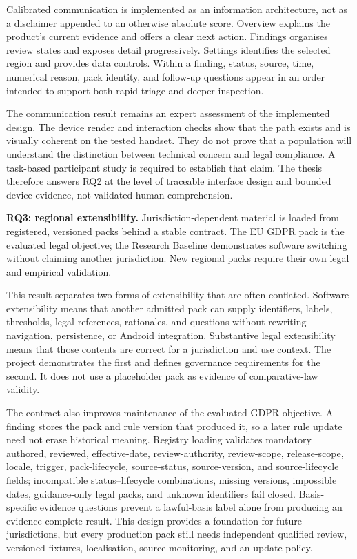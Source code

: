 Calibrated communication is implemented as an information architecture, not as a disclaimer appended to an otherwise absolute score. Overview explains the product's current evidence and offers a clear next action. Findings organises review states and exposes detail progressively. Settings identifies the selected region and provides data controls. Within a finding, status, source, time, numerical reason, pack identity, and follow-up questions appear in an order intended to support both rapid triage and deeper inspection.

The communication result remains an expert assessment of the implemented design. The device render and interaction checks show that the path exists and is visually coherent on the tested handset. They do not prove that a population will understand the distinction between technical concern and legal compliance. A task-based participant study is required to establish that claim. The thesis therefore answers RQ2 at the level of traceable interface design and bounded device evidence, not validated human comprehension.

\textbf{RQ3: regional extensibility.} Jurisdiction-dependent material is loaded from registered, versioned packs behind a stable contract. The EU GDPR pack is the evaluated legal objective; the Research Baseline demonstrates software switching without claiming another jurisdiction. New regional packs require their own legal and empirical validation.

This result separates two forms of extensibility that are often conflated. Software extensibility means that another admitted pack can supply identifiers, labels, thresholds, legal references, rationales, and questions without rewriting navigation, persistence, or Android integration. Substantive legal extensibility means that those contents are correct for a jurisdiction and use context. The project demonstrates the first and defines governance requirements for the second. It does not use a placeholder pack as evidence of comparative-law validity.

The contract also improves maintenance of the evaluated GDPR objective. A finding stores the pack and rule version that produced it, so a later rule update need not erase historical meaning. Registry loading validates mandatory authored, reviewed, effective-date, review-authority, review-scope, release-scope, locale, trigger, pack-lifecycle, source-status, source-version, and source-lifecycle fields; incompatible status--lifecycle combinations, missing versions, impossible dates, guidance-only legal packs, and unknown identifiers fail closed. Basis-specific evidence questions prevent a lawful-basis label alone from producing an evidence-complete result. This design provides a foundation for future jurisdictions, but every production pack still needs independent qualified review, versioned fixtures, localisation, source monitoring, and an update policy.

